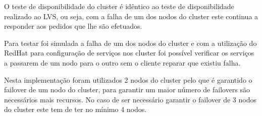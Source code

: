 \hspace{5mm} O teste de disponibilidade do cluster é idêntico ao teste de disponibilidade realizado ao LVS, ou seja, com a falha de um dos nodos do cluster este continua a responder aos pedidos que lhe são efetuados.

\hspace{5mm} Para testar foi simulada a falha de um dos nodos do cluster e com a utilização do RedHat para configuração de serviços nos cluster foi possível verificar os serviços a passarem de um nodo para o outro sem o cliente reparar que existiu falha.

\hspace{5mm} Nesta implementação foram utilizados 2 nodos do cluster pelo que é garantido o failover de um nodo do cluster, para garantir um maior número de failovers são necessários mais recursos. No caso de ser necessário garantir o failover de 3 nodos do cluster este tem de ter no mínimo 4 nodos.